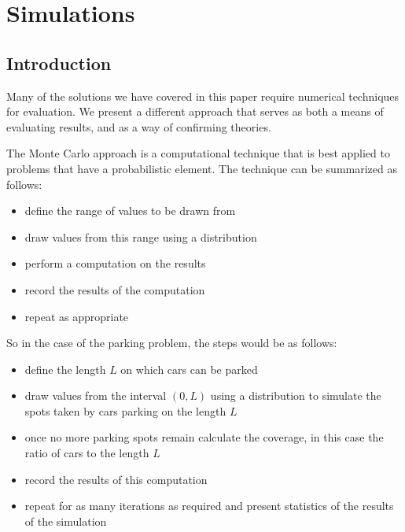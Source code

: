 
\chapter{Simulations}











\section{Introduction}

Many of the solutions we have covered in this paper require 
numerical techniques for evaluation. We present a different 
approach that serves as both a means of evaluating results, 
and as a way of confirming theories. \bigskip

%
%

The Monte Carlo approach is a computational technique that 
is best applied to problems that have a probabilistic 
element. The technique can be summarized as follows: \bigskip

\begin{itemize}
	\item define the range of values to be drawn from
	\item draw values from this range using a distribution
	\item perform a computation on the results 
	\item record the results of the computation
	\item repeat as appropriate
\end{itemize}\medskip

So in the case of the parking problem, the steps would 
be as follows: \bigskip

\begin{itemize}
	\item define the length $L$ on which cars can be parked
	\item draw values from the interval $(0, L)$ using a 
	distribution to simulate the spots taken by cars parking 
	on the length $L$
	\item once no more parking spots remain calculate the 
	coverage, in this case the ratio of cars to the length $L$
	\item record the results of this computation
	\item repeat for as many iterations as required and 
	present statistics of the results of the simulation
\end{itemize}\medskip

